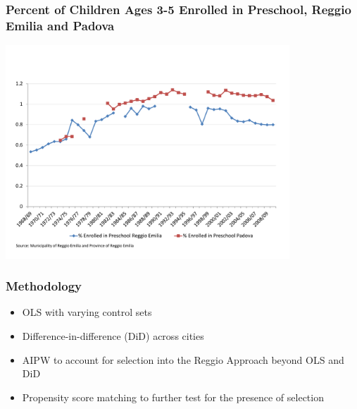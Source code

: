 \documentclass[static]{JJH-Beamer_PAGENOS}
\begin{document}
\begin{frame}
\frametitle{Percent of Children Ages 3-5 Enrolled in Preschool, Reggio Emilia and Padova}
\centering
\includegraphics[width=0.8\textwidth]{../../output/image/Enrollement_Preschool_age3-5.pdf}
\end{frame}

\begin{frame}
\frametitle{Methodology}
\begin{itemize}
	\item OLS with varying control sets 
	\item Difference-in-difference (DiD) across cities 
	\item AIPW to account for selection into the Reggio Approach beyond OLS and DiD
	\item Propensity score matching to further test for the presence of selection 
\end{itemize}
\end{frame}

\end{document}

